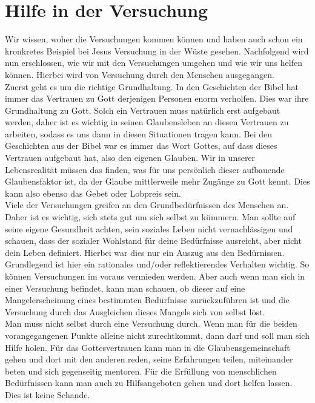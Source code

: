 \section{Hilfe in der Versuchung}
Wir wissen, woher die Versuchungen kommen können und haben auch schon ein kronkretes Beispiel bei Jesus Versuchung in
der Wüste gesehen. Nachfolgend wird nun erschlossen, wie wir mit den Versuchungen umgehen und wie wir uns helfen
können. Hierbei wird von Versuchung durch den Menschen ausgegangen. \\

Zuerst geht es um die richtige Grundhaltung. In den Geschichten der Bibel hat immer das Vertrauen zu Gott derjenigen
Personen enorm verholfen. Dies war ihre Grundhaltung zu Gott. Solch ein Vertrauen muss natürlich erst aufgebaut werden,
daher ist es wichtig in seinen Glaubensleben an diesen Vertrauen zu arbeiten, sodass es uns dann in diesen Situationen
tragen kann. Bei den Geschichten aus der Bibel war es immer das Wort Gottes, auf dass dieses Vertrauen aufgebaut hat,
also den eigenen Glauben. Wir in unserer Lebensrealität müssen das finden, was für uns persönlich dieser aufbauende
Glaubensfaktor ist, da der Glaube mittlerweile mehr Zugänge zu Gott kennt. Dies kann also ebenso das Gebet oder
Lobpreis sein. \\

Viele der Versuchungen greifen an den Grundbedürfnissen des Menschen an. Daher ist es wichtig, sich stets gut um sich
selbst zu kümmern. Man sollte auf seine eigene Gesundheit achten, sein soziales Leben nicht vernachlässigen und
schauen, dass der sozialer Wohlstand für deine Bedürfnisse ausreicht, aber nicht dein Leben definiert. Hierbei war dies
nur ein Auszug aus den Bedürnissen. Grundlegend ist hier ein rationales und/oder reflektierendes Verhalten wichtig. So
können Versuchungen im voraus vermieden werden. Aber auch wenn man sich in einer Versuchung befindet, kann man schauen,
ob dieser auf eine Mangelerscheinung eines bestimmten Bedürfnisse zurückzuführen ist und die Versuchung durch das
Ausgleichen dieses Mangels sich von selbst löst. \\

Man muss nicht selbst durch eine Versuchung durch. Wenn man für die beiden vorangegangenen Punkte alleine nicht
zurechtkommt, dann darf und soll man sich Hilfe holen. Für das Gottesvertrauen kann man in die Glaubensgemeinschaft
gehen und dort mit den anderen reden, seine Erfahrungen teilen, miteinander beten und sich gegenseitig mentoren. Für
die Erfüllung von menschlichen Bedürfnissen kann man auch zu Hilfsangeboten gehen und dort helfen lassen. Dies ist
keine Schande. \\

